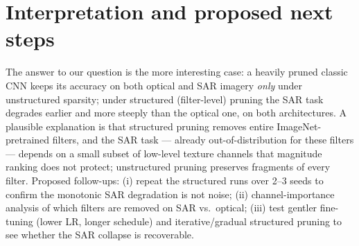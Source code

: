 \documentclass[11pt]{article}
\begin{document}
\section*{Interpretation and proposed next steps}
The answer to our question is the more interesting case: a heavily
pruned classic CNN keeps its accuracy on both optical and SAR imagery
\emph{only} under unstructured sparsity; under structured (filter-level)
pruning the SAR task degrades earlier and more steeply than the optical
one, on both architectures. A plausible explanation is that structured
pruning removes entire ImageNet-pretrained filters, and the SAR task ---
already out-of-distribution for these filters --- depends on a small
subset of low-level texture channels that magnitude ranking does not
protect; unstructured pruning preserves fragments of every filter.
Proposed follow-ups: (i) repeat the structured runs over 2--3 seeds to
confirm the monotonic SAR degradation is not noise; (ii) channel-importance
analysis of which filters are removed on SAR vs.\ optical; (iii) test
gentler fine-tuning (lower LR, longer schedule) and iterative/gradual
structured pruning to see whether the SAR collapse is recoverable.
\end{document}
